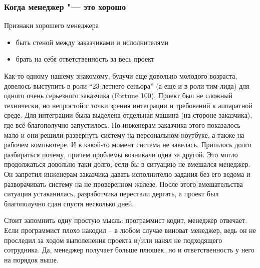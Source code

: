 \documentclass{../industrial-development}
\begin{document}
\begin{frame} \frametitle{Когда менеджер "--- это хорошо}
	\begin{block}{Признаки хорошего менеджера}
		\begin{itemize}
			\item быть стеной между заказчиками и исполнителями
			\item брать на себя ответственность за весь проект
		\end{itemize}
	\end{block}
\end{frame}
\lecturenotes
Как-то одному нашему знакомому, будучи еще довольно молодого возраста, довелось выступить в роли “23-летнего сеньора” (а еще и в роли тим-лида) для одного очень серьезного заказчика (Fortune 100). Проект был не сложный технически, но непростой с точки зрения интеграции и требований к аппаратной среде. Для интеграции была выделена отдельная машина (на стороне заказчика), где всё благополучно запустилось. Но инженерам заказчика этого показалось мало и они решили развернуть систему на персональном ноутбуке, а также на рабочем компьютере. И в какой-то момент система не завелась. Пришлось долго разбираться почему, причем проблемы возникали одна за другой. 
Это могло продолжаться довольно таки долго, если бы в ситуацию не вмешался менеджер. Он запретил инженерам заказчика давать исполнителю задания без его ведома и разворачивать систему на не проверенном железе. После этого вмешательства ситуация устаканилась, разработчика перестали дергать, а проект был благополучно сдан спустя несколько дней.

Стоит запомнить одну простую мысль: программист кодит, менеджер отвечает. Если программист плохо накодил – в любом случае виноват менеджер, ведь он не проследил за ходом выполенения проекта и/или нанял не подходящего сотрудника. 
Да, менеджер получает больше плюшек, но и ответственность у него на порядок выше.
~\cite{Managers_in_IT}
\end{document}
